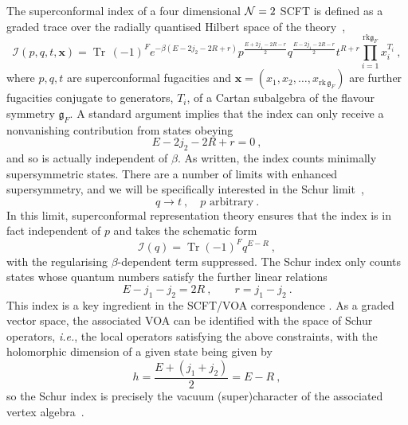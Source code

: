 \documentclass[a4paper]{article}
\def\NN{{\cal N}}
\def\Tr{\mathop{\mathrm{Tr}}\nolimits}
\def\gf{\mathfrak{g}}
\def \rk{\mathrm{rk}}
\begin{document}
The superconformal index of a four dimensional $\NN=2$ SCFT is defined as a graded trace over the radially quantised Hilbert space of the theory~\cite{Kinney:2005ej,Rastelli:2014jja},
\begin{equation}\label{eq:ind2}
    \mathcal{I}(p,q,t,\mathbf{x}) = \Tr\,(-1)^Fe^{-\beta(E-2j_2-2R+r)}p^{\frac{E+2j_1-2R-r}{2}}q^{\frac{E-2j_1-2R-r}{2}}t^{R+r}\prod_{i=1}^{\mathrm{rk} \mathfrak{g}_F}x_i^{T_i}~,
\end{equation}
where $p,q,t$ are superconformal fugacities and $\mathbf{x}=(x_1,x_2,\dots,x_{\rk\,\gf_F})$ are further fugacities conjugate to generators, $T_i$, of a Cartan subalgebra of the flavour symmetry $\gf_F$. A standard argument implies that the index can only receive a nonvanishing contribution from states obeying
\begin{equation}\label{eq:index_contribute}
    E-2j_2-2R+r=0~,
\end{equation}
and so is actually independent of $\beta$. As written, the index counts minimally supersymmetric states. There are a number of limits with enhanced supersymmetry, and we will be specifically interested in the Schur limit~\cite{Gadde:2011uv},
\begin{equation}\label{eq:limschur}
    q\rightarrow t~,\quad p \text{ arbitrary}~.
\end{equation}
In this limit, superconformal representation theory ensures that the index is in fact independent of $p$ and takes the schematic form
\begin{equation}\label{eq:indschur}
    \mathcal{I}(q) = \Tr(-1)^Fq^{E-R}~,
\end{equation}
with the regularising $\beta$-dependent term suppressed. The Schur index only counts states whose quantum numbers satisfy the further linear relations
\begin{equation}\label{eq:schurindop}
    E-j_1-j_2=2R~,\qquad r = j_1-j_2~.
\end{equation}
This index is a key ingredient in the SCFT/VOA correspondence \cite{Beem:2013sza}. As a graded vector space, the associated VOA can be identified with the space of Schur operators, \emph{i.e.}, the local operators satisfying the above constraints, with the holomorphic dimension of a given state being given by
\begin{equation}\label{eq:holo_dim_schur}
    h = \frac{E + (j_1+j_2)}{2} = E - R~,
\end{equation}
so the Schur index is precisely the vacuum (super)character of the associated vertex algebra~\cite{Beem:2013sza}.
\end{document}
